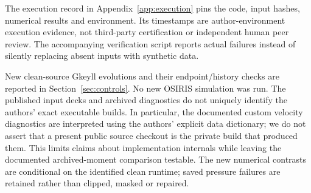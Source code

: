 The execution record in Appendix~\ref{app:execution} pins the code, input
hashes, numerical results and environment. Its timestamps are author-environment
execution evidence, not third-party certification or independent human peer
review. The accompanying verification script reports actual failures instead
of silently replacing absent inputs with synthetic data.

New clean-source Gkeyll evolutions and their endpoint/history checks are
reported in Section~\ref{sec:controls}. No new OSIRIS simulation was run.
The published input decks and archived diagnostics do not uniquely identify the
authors' exact executable builds. In particular, the documented custom
velocity diagnostics are interpreted using the authors' explicit data
dictionary; we do not assert that a present public source checkout is the
private build that produced them. This limits claims about implementation
internals while leaving the documented archived-moment comparison testable.
The new numerical contrasts are conditional on the identified clean runtime;
saved pressure failures are retained rather than clipped, masked or repaired.
